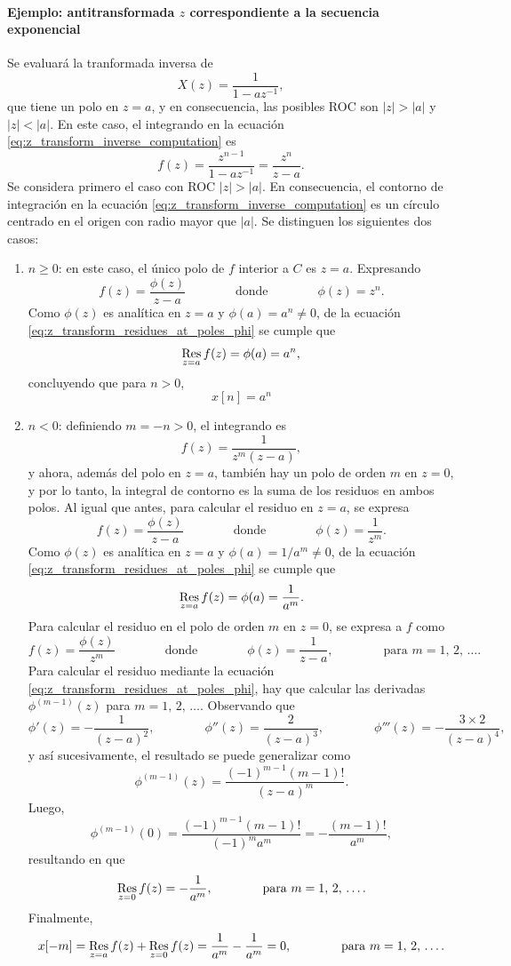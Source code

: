 \documentclass[a4paper]{report}
\def\Res{\qopname\relax m{Res}}
\begin{document}
\paragraph{Ejemplo: antitransformada \(z\) correspondiente a la secuencia exponencial} Se evaluará la tranformada inversa de 
\[
 X(z)=\frac{1}{1-az^{-1}},
\]
que tiene un polo en \(z=a\),  y en consecuencia, las posibles ROC son \(|z|>|a|\) y \(|z|<|a|\). En este caso, el integrando en la ecuación \ref{eq:z_transform_inverse_computation} es 
\[
 f(z)=\frac{z^{n-1}}{1-az^{-1}}=\frac{z^n}{z-a}.
\]
Se considera primero el caso con ROC \(|z|>|a|\). En consecuencia, el contorno de integración en la ecuación \ref{eq:z_transform_inverse_computation} es un círculo centrado en el origen con radio mayor que \(|a|\). Se distinguen los siguientes dos casos:
\begin{enumerate}
 \item \(n\geq0\): en este caso, el único polo de \(f\) interior a \(C\) es \(z=a\). Expresando
 \[
  f(z)=\frac{\phi(z)}{z-a}
  \qquad\qquad\textrm{donde}\qquad\qquad
  \phi(z)=z^n.
 \]
 Como \(\phi(z)\) es analítica en \(z=a\) y \(\phi(a)=a^n\neq0\), de la ecuación \ref{eq:z_transform_residues_at_poles_phi} se cumple que 
 \[
  \Res_{z=a}f(z)=\phi(a)=a^n,
 \]
 concluyendo que para \(n>0\), 
 \[
  x[n]=a^n
 \]
 \item \(n<0\): definiendo \(m=-n>0\), el integrando es 
 \[
  f(z)=\dfrac{1}{z^m(z-a)},
 \]
 y ahora, además del polo en \(z=a\), también hay un polo de orden \(m\) en \(z=0\), y por lo tanto, la integral de contorno es la suma de los residuos en ambos polos. Al igual que antes, para calcular el residuo en \(z=a\), se expresa
 \[
  f(z)=\frac{\phi(z)}{z-a}
  \qquad\qquad\textrm{donde}\qquad\qquad
  \phi(z)=\frac{1}{z^m}.
 \]
 Como \(\phi(z)\) es analítica en \(z=a\) y \(\phi(a)=1/a^m\neq0\), de la ecuación \ref{eq:z_transform_residues_at_poles_phi} se cumple que 
 \[
  \Res_{z=a}f(z)=\phi(a)=\frac{1}{a^m}.
 \]
 Para calcular el residuo en el polo de orden \(m\) en \(z=0\), se expresa a \(f\) como
 \[
  f(z)=\frac{\phi(z)}{z^m}
  \qquad\qquad\textrm{donde}\qquad\qquad
  \phi(z)=\frac{1}{z-a},
  \qquad\qquad\textrm{para }m=1,\,2,\,\dots.
 \]
 Para calcular el residuo mediante la ecuación \ref{eq:z_transform_residues_at_poles_phi}, hay que calcular las derivadas \(\phi^{(m-1)}(z)\) para \(m=1,\,2,\,\dots\). Observando que
 \[
  \phi'(z)=-\frac{1}{(z-a)^2},\qquad\qquad 
  \phi''(z)=\frac{2}{(z-a)^3},\qquad\qquad
  \phi'''(z)=-\frac{3\times2}{(z-a)^4},
 \]
 y así sucesivamente, el resultado se puede generalizar como 
 \[
  \phi^{(m-1)}(z)=\frac{(-1)^{m-1}(m-1)!}{(z-a)^m}.
 \] 
 Luego,
 \[
  \phi^{(m-1)}(0)=\frac{(-1)^{m-1}(m-1)!}{(-1)^m a^m}=-\frac{(m-1)!}{a^m},
 \] 
 resultando en que 
 \[
  \Res_{z=0}f(z)=-\frac{1}{a^m},
  \qquad\qquad\textrm{para }m=1,\,2,\,\dots.
 \]
 Finalmente,
 \[
  x[-m]=\Res_{z=a}f(z)+\Res_{z=0}f(z)=\frac{1}{a^m}-\frac{1}{a^m}=0,
  \qquad\qquad\textrm{para }m=1,\,2,\,\dots.
 \]
\end{enumerate}
\end{document}

